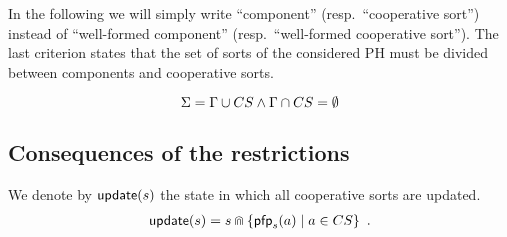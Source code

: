 In the following we will simply write “component” (resp.~“cooperative sort”) instead of “well-formed component” (resp.~“well-formed cooperative sort”).
The last criterion states that the set of sorts of the considered PH must be divided between components and cooperative sorts.

\begin{criterion}
\label{cr:compcs}
  $$\Sigma = \Gamma \cup CS \wedge \Gamma \cap CS = \emptyset$$
\end{criterion}




\subsection{Consequences of the restrictions}
We denote by $\mathsf{update}(s)$ the state in which all cooperative sorts are updated.
\begin{align*}
  \mathsf{update}(s) = s \Cap \{ \mathsf{pfp}_{s}(a) \mid a \in CS \} \enspace.
\end{align*}

